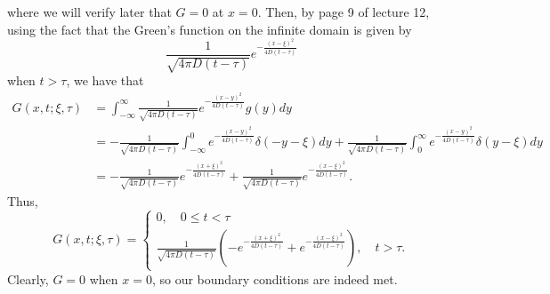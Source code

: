 \documentclass{article}
\begin{document}
where we will verify later that $G=0$ at $x=0$. Then, by page 9 of lecture 12, using the fact that the Green's function on the infinite domain is given by
\[
\frac{1}{\sqrt{4\pi D(t-\tau)}}e^{-\frac{(x-\xi)^2}{4D(t-\tau)}}
\]
when $t>\tau$, we have that 
\begin{align*}
G(x,t;\xi,\tau)&=\int_{-\infty}^\infty\frac{1}{\sqrt{4\pi D(t-\tau)}}e^{-\frac{(x-y)^2}{4D(t-\tau)}}g(y)dy\\&=
-\frac{1}{\sqrt{4\pi D(t-\tau)}}\int_{-\infty}^0e^{-\frac{(x-y)^2}{4D(t-\tau)}}\delta(-y-\xi)dy+\frac{1}{\sqrt{4\pi D(t-\tau)}}\int_{0}^\infty e^{-\frac{(x-y)^2}{4D(t-\tau)}}\delta(y-\xi)dy\\&=
-\frac{1}{\sqrt{4\pi D(t-\tau)}}e^{-\frac{(x+\xi)^2}{4D(t-\tau)}}+\frac{1}{\sqrt{4\pi D(t-\tau)}}e^{-\frac{(x-\xi)^2}{4D(t-\tau)}}.
\end{align*}
Thus,
\[
G(x,t;\xi,\tau)=\begin{cases}
	0, \quad 0\leq t<\tau\\
	\frac{1}{\sqrt{4\pi D(t-\tau)}}\left(-e^{-\frac{(x+\xi)^2}{4D(t-\tau)}}+e^{-\frac{(x-\xi)^2}{4D(t-\tau)}}\right), \quad t>\tau.
\end{cases}
\]
Clearly, $G=0$ when $x=0$, so our boundary conditions are indeed met.  
\end{document}

